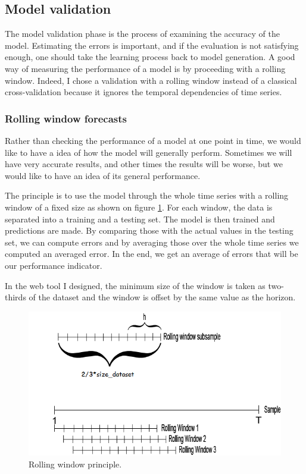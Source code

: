\documentclass[11pt,a4paper,oneside]{book}
\begin{document}
\subsection{Model validation}

The model validation phase is the process of examining the accuracy of the model. Estimating the errors is important, and if the evaluation is not satisfying enough, one should take the learning process back to model generation. A good way of measuring the performance of a model is by proceeding with a rolling window. Indeed, I chose a validation with a rolling window instead of a classical cross-validation because it ignores the temporal dependencies of time series. \cite{BenTaieb}


\subsubsection{Rolling window forecasts}\label{rwindow}


Rather than checking the performance of a model at one point in time, we would like to have a idea of how the model will generally perform. Sometimes we will have very accurate results, and other times the results will be worse, but we would like to have an idea of its general performance.

The principle is to use the model through the whole time series with a rolling window of a fixed size as shown on figure \ref{fig:rolling}. For each window, the data is separated into a training and a testing set. The model is then trained and predictions are made. By comparing those with the actual values in the testing set, we can compute errors and by averaging those over the whole time series we computed an averaged error. In the end, we get an average of errors that will be our performance indicator.

In the web tool I designed, the minimum size of the window is taken as two-thirds of the dataset and the window is offset by the same value as the horizon.


\begin{figure}[!h]
  \centering
    \includegraphics[scale=0.7]{img/rollingwindow.png}
  \caption{Rolling window principle\cite{rolling}.}
  \label{fig:rolling}
\end{figure}
\end{document}
